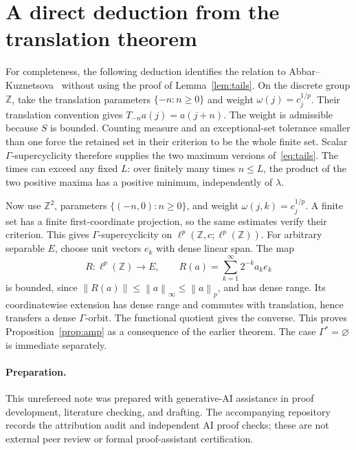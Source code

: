 \documentclass[11pt]{article}
\theoremstyle{remark}
\newcommand{\Z}{\mathbb Z}
\newcommand{\norm}[1]{\left\|#1\right\|}
\begin{document}
\section{A direct deduction from the translation theorem}\label{sec:prior}

For completeness, the following deduction identifies the relation to Abbar--Kuznetsova~\cite[Theorem B]{AK} without using the proof of Lemma~\ref{lem:tails}. On the discrete group $\Z$, take the translation parameters $\{-n:n\ge0\}$ and weight $\omega(j)=c_j^{1/p}$. Their translation convention gives $T_{-n}a(j)=a(j+n)$. The weight is admissible because $S$ is bounded. Counting measure and an exceptional-set tolerance smaller than one force the retained set in their criterion to be the whole finite set. Scalar $\Gamma$-supercyclicity therefore supplies the two maximum versions of~\eqref{eq:tails}. The times can exceed any fixed $L$: over finitely many times $n\le L$, the product of the two positive maxima has a positive minimum, independently of $\lambda$.

Now use $\Z^2$, parameters $\{(-n,0):n\ge0\}$, and weight $\omega(j,k)=c_j^{1/p}$. A finite set has a finite first-coordinate projection, so the same estimates verify their criterion. This gives $\Gamma$-supercyclicity on $\ell^p(\Z,c;\ell^p(\Z))$. For arbitrary separable $E$, choose unit vectors $e_k$ with dense linear span. The map
\[
R:\ell^p(\Z)\to E,\qquad R(a)=\sum_{k=1}^{\infty}2^{-k}a_k e_k
\]
is bounded, since $\norm{R(a)}\le\norm{a}_\infty\le\norm{a}_p$, and has dense range. Its coordinatewise extension has dense range and commutes with translation, hence transfers a dense $\Gamma$-orbit. The functional quotient gives the converse. This proves Proposition~\ref{prop:amp} as a consequence of the earlier theorem. The case $\Gamma^*=\varnothing$ is immediate separately.

\paragraph{Preparation.} This unrefereed note was prepared with generative-AI assistance in proof development, literature checking, and drafting. The accompanying repository records the attribution audit and independent AI proof checks; these are not external peer review or formal proof-assistant certification.
\end{document}

